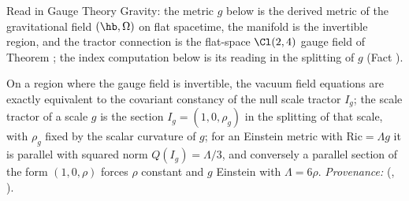 Read in Gauge Theory Gravity: the metric $g$ below is the derived metric of the gravitational field $(\hb, \Omega)$ on flat spacetime, the manifold is the invertible region, and the tractor connection is the flat-space $\Cl(2,4)$ gauge field of Theorem ; the index computation below is its reading in the splitting of $g$ (Fact ).

On a region where the gauge field is invertible, the vacuum field equations are exactly equivalent to the covariant constancy of the null scale tractor $I_g$; the scale tractor of a scale $g$ is the section $I_g = (1, 0, \rho_g)$ in the splitting of that scale, with $\rho_g$ fixed by the scalar curvature of $g$; for an Einstein metric with $\mathrm{Ric} = \Lambda g$ it is parallel with squared norm $Q(I_g) = \Lambda/3$, and conversely a parallel section of the form $(1,0,\rho)$ forces $\rho$ constant and $g$ Einstein with $\Lambda = 6\rho$. \emph{Provenance:} \cite[Thm.~4.5, Thm.~4.7]{ButlerT6} (, ).
